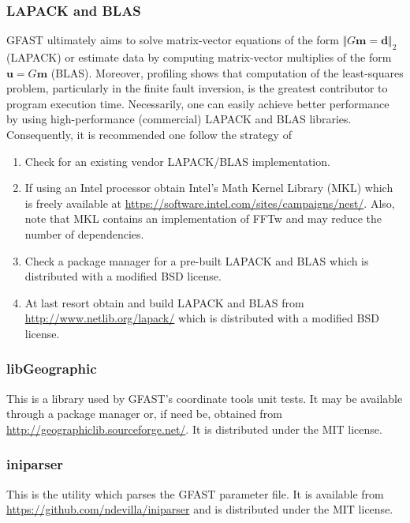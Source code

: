 \documentclass[12pt]{article}
\begin{document}
\subsubsection{LAPACK and BLAS} GFAST ultimately aims to solve matrix-vector
equations of the form $\Vert G \textbf{m} = \textbf{d}\Vert_2 $ (LAPACK) or estimate 
data by computing matrix-vector multiplies of the form $\textbf{u} = G \textbf{m}$ (BLAS).  
Moreover, profiling shows that computation of the least-squares problem, particularly in the
finite fault inversion, is the greatest contributor to program execution time.  
Necessarily, one can easily achieve better performance
by using high-performance (commercial) LAPACK and BLAS libraries.  Consequently, it is recommended one
follow the strategy of 
\begin{enumerate}
  \item Check for an existing vendor LAPACK/BLAS implementation.  
  \item If using an Intel processor obtain Intel's Math Kernel Library (MKL) 
        which is freely available at \url{https://software.intel.com/sites/campaigns/nest/}.
        Also, note that MKL contains an implementation of FFTw and may reduce the number of
        dependencies. 
  \item Check a package manager for a pre-built LAPACK and BLAS which is distributed with a
  modified BSD license.
  \item At last resort obtain and build LAPACK and BLAS from \url{http://www.netlib.org/lapack/}
  which is distributed with a modified BSD license.  
\end{enumerate}

\subsubsection{libGeographic}
This is a library used by GFAST's coordinate tools unit tests.  It may be available through
a package manager or, if need be, obtained from \url{http://geographiclib.sourceforge.net/}.  It is
distributed under the MIT license. 

\subsubsection{iniparser}
This is the utility which parses the GFAST parameter file.  It is available from
\url{https://github.com/ndevilla/iniparser} and is distributed under the MIT license.
\end{document}
